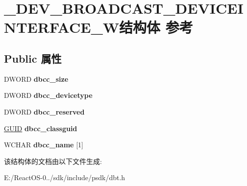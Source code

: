 \hypertarget{struct___d_e_v___b_r_o_a_d_c_a_s_t___d_e_v_i_c_e_i_n_t_e_r_f_a_c_e___w}{}\section{\+\_\+\+D\+E\+V\+\_\+\+B\+R\+O\+A\+D\+C\+A\+S\+T\+\_\+\+D\+E\+V\+I\+C\+E\+I\+N\+T\+E\+R\+F\+A\+C\+E\+\_\+\+W结构体 参考}
\label{struct___d_e_v___b_r_o_a_d_c_a_s_t___d_e_v_i_c_e_i_n_t_e_r_f_a_c_e___w}
\subsection*{Public 属性}
\begin{DoxyCompactItemize}
\item 
\mbox{\label{struct___d_e_v___b_r_o_a_d_c_a_s_t___d_e_v_i_c_e_i_n_t_e_r_f_a_c_e___w_abe45605c140c1d435fb16d8e5bc9c5b7}} 
D\+W\+O\+RD {\bfseries dbcc\+\_\+size}
\item 
\mbox{\label{struct___d_e_v___b_r_o_a_d_c_a_s_t___d_e_v_i_c_e_i_n_t_e_r_f_a_c_e___w_a1047951805de7d9708c1b1c5af240dd8}} 
D\+W\+O\+RD {\bfseries dbcc\+\_\+devicetype}
\item 
\mbox{\label{struct___d_e_v___b_r_o_a_d_c_a_s_t___d_e_v_i_c_e_i_n_t_e_r_f_a_c_e___w_a280bd03ba257f26fb13011d827fbc804}} 
D\+W\+O\+RD {\bfseries dbcc\+\_\+reserved}
\item 
\mbox{\label{struct___d_e_v___b_r_o_a_d_c_a_s_t___d_e_v_i_c_e_i_n_t_e_r_f_a_c_e___w_acdae9724191480ca4ec6d211b094cabb}} 
\hyperlink{interface_g_u_i_d}{G\+U\+ID} {\bfseries dbcc\+\_\+classguid}
\item 
\mbox{\label{struct___d_e_v___b_r_o_a_d_c_a_s_t___d_e_v_i_c_e_i_n_t_e_r_f_a_c_e___w_a8fd25ad10ffa405495229a3ae02dcfc8}} 
W\+C\+H\+AR {\bfseries dbcc\+\_\+name} \mbox{[}1\mbox{]}
\end{DoxyCompactItemize}


该结构体的文档由以下文件生成\+:\begin{DoxyCompactItemize}
\item 
E\+:/\+React\+O\+S-\/0../sdk/include/psdk/dbt.\+h\end{DoxyCompactItemize}
